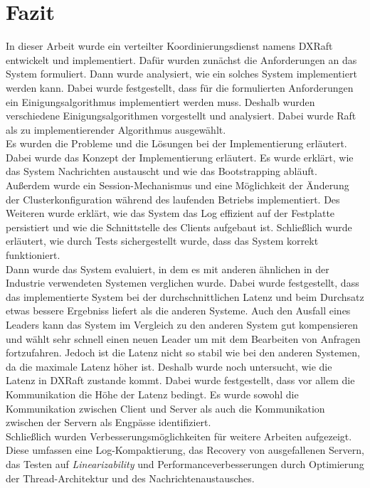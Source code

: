 \chapter{Fazit}

In dieser Arbeit wurde ein verteilter Koordinierungsdienst namens DXRaft entwickelt und implementiert. Dafür wurden zunächst die Anforderungen an das System formuliert. Dann wurde analysiert, wie ein solches System implementiert werden kann. Dabei wurde festgestellt, dass für die formulierten Anforderungen ein Einigungsalgorithmus implementiert werden muss. Deshalb wurden verschiedene Einigungsalgorithmen vorgestellt und analysiert. Dabei wurde Raft als zu implementierender Algorithmus ausgewählt. \\
Es wurden die Probleme und die Lösungen bei der Implementierung erläutert. Dabei wurde das Konzept der Implementierung erläutert. Es wurde erklärt, wie das System Nachrichten austauscht und wie das Bootstrapping abläuft. Außerdem wurde ein Session-Mechanismus und eine Möglichkeit der Änderung der Clusterkonfiguration während des laufenden Betriebs implementiert. Des Weiteren wurde erklärt, wie das System das Log effizient auf der Festplatte persistiert und wie die Schnittstelle des Clients aufgebaut ist. Schließlich wurde erläutert, wie durch Tests sichergestellt wurde, dass das System korrekt funktioniert. \\
 Dann wurde das System evaluiert, in dem es mit anderen ähnlichen in der Industrie verwendeten Systemen verglichen wurde. Dabei wurde festgestellt, dass das implementierte System bei der durchschnittlichen Latenz und beim Durchsatz etwas bessere Ergebniss liefert als die anderen Systeme. Auch den Ausfall eines Leaders kann das System im Vergleich zu den anderen System gut kompensieren und wählt sehr schnell einen neuen Leader um mit dem Bearbeiten von Anfragen fortzufahren. Jedoch ist die Latenz nicht so stabil wie bei den anderen Systemen, da die maximale Latenz höher ist. Deshalb wurde noch untersucht, wie die Latenz in DXRaft zustande kommt. Dabei wurde festgestellt, dass vor allem die Kommunikation die Höhe der Latenz bedingt. Es wurde sowohl die Kommunikation zwischen Client und Server als auch die Kommunikation zwischen der Servern als Engpässe identifiziert. \\
Schließlich wurden Verbesserungsmöglichkeiten für weitere Arbeiten aufgezeigt. Diese umfassen eine Log-Kompaktierung, das Recovery von ausgefallenen Servern, das Testen auf \textit{Linearizability} und Performanceverbesserungen durch Optimierung der Thread-Architektur und des Nachrichtenaustausches.\\